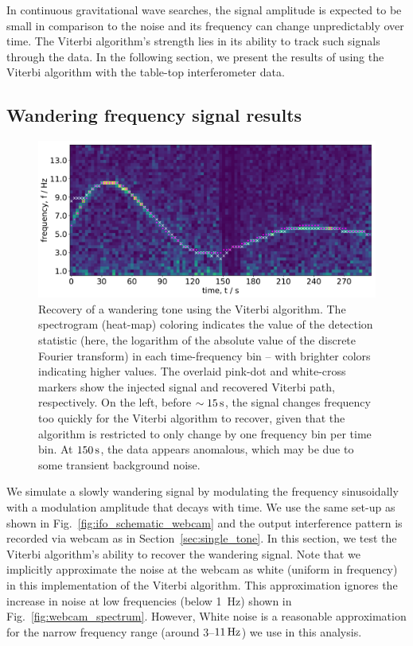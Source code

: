 \documentclass[paper-main.tex]{subfiles}
\begin{document}
In continuous gravitational wave searches, the signal amplitude is expected to be small in comparison to the noise and its frequency can change unpredictably over time.
The Viterbi algorithm's strength lies in its ability to track such signals through the data.
In the following section, we present the results of using the Viterbi algorithm with the table-top interferometer data. 







\subsection{Wandering frequency signal results}
\label{sec:wanderingResults}

\begin{figure}
	\includegraphics[width=\textwidth]{figures/expt_overlay_2_viterbi_test_webcam.pdf}
	\caption{\label{fig:viterbi_overlay}
Recovery of a wandering tone using the Viterbi algorithm.
The spectrogram (heat-map) coloring indicates the value of the detection statistic (here, the logarithm of the absolute value of the discrete Fourier transform) in each time-frequency bin -- with brighter colors indicating higher values. 
The overlaid pink-dot and white-cross markers show the injected signal and recovered Viterbi path, respectively. 
On the left, before $\sim 15\,{\rm s}$, the signal changes frequency too quickly for the Viterbi algorithm to recover, given that the algorithm is restricted to only change by one frequency bin per time bin. 
At $150\,{\rm s}$, the data appears anomalous, which may be due to some transient background noise. }
\end{figure}
 

We simulate a slowly wandering signal by modulating the frequency sinusoidally with a modulation amplitude that decays with time. 
We use the same set-up as shown in Fig.~\ref{fig:ifo_schematic_webcam} and the output interference pattern is recorded via webcam as in Section~\ref{sec:single_tone}. 
In this section, we test the Viterbi algorithm’s ability to recover the wandering signal. 
Note that we implicitly approximate the noise at the webcam as white (uniform in frequency) in this implementation of the Viterbi algorithm. 
This approximation ignores the increase in noise at low frequencies (below 1~Hz) shown in Fig.~\ref{fig:webcam_spectrum}.
However, White noise is a reasonable approximation for the narrow frequency range (around $3$--$11\,{\rm Hz}$) we use in this analysis. 
\end{document}
